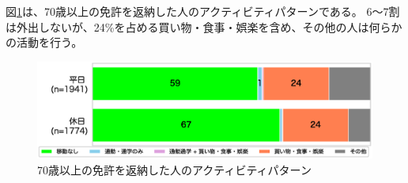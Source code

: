 \documentclass[a4paper,12pt, uplatex]{jsbook}
\begin{document}
図\ref{fig:activity_pattern_return}は、70歳以上の免許を返納した人のアクティビティパターンである。
6〜7割は外出しないが、24\%を占める買い物・食事・娯楽を含め、その他の人は何らかの活動を行う。
%
\begin{figure}[htbp]
    \centering
    \includegraphics[width=1.0\textwidth]{picture/activity_pattern_返納.eps}
    \caption{70歳以上の免許を返納した人のアクティビティパターン}
    \label{fig:activity_pattern_return}
\end{figure}
\end{document}
